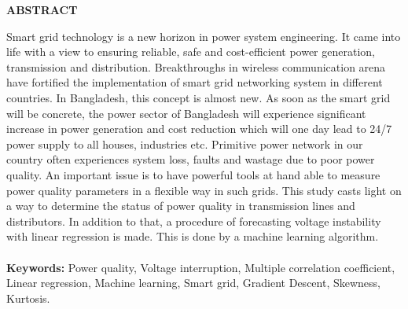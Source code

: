 \documentclass[a4paper,12pt,oneside]{book}
\newcommand{\HeadingR}[1]{
{\large		
\bfseries{#1}}}
\begin{document}
\begin{center}
\HeadingR{\MakeUppercase{Abstract}}
\end{center}
Smart grid technology is a new horizon in power system engineering. It came into life with a view to ensuring reliable, safe and cost-efficient power generation, transmission and distribution. Breakthroughs in wireless communication arena have fortified the implementation of smart grid networking system in different countries. In Bangladesh, this concept is almost new\cite{6497752}. As soon as the smart grid will be concrete, the power sector of Bangladesh will experience significant increase in power generation and cost reduction which will one day lead to 24/7 power supply to all houses, industries etc. Primitive power network in our country often experiences system loss, faults and wastage due to poor power quality. An important issue is to have powerful tools at hand able to measure power quality parameters in a flexible way in such grids\cite{6563537}. This study casts light on a way to determine the status of power quality in transmission lines and distributors. In addition to that, a procedure of forecasting voltage instability with linear regression is made. This is done by a machine learning algorithm.
\\\\
\textbf{Keywords:} Power quality, Voltage interruption, Multiple correlation coefficient, Linear regression, Machine learning, Smart grid, Gradient Descent, Skewness, Kurtosis.

\newpage
\renewcommand\contentsname{CONTENTS}
\begin{singlespacing}
{\hypersetup{linkcolor=black}
\tableofcontents
}
\end{singlespacing}

\end{document}
